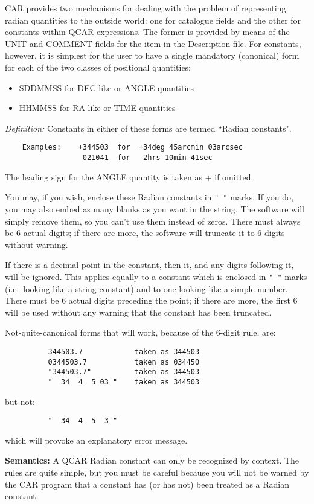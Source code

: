 CAR provides two mechanisms for dealing with the problem of representing radian
quantities to the outside world: one for catalogue fields and the other for
constants within QCAR expressions.
The former is provided by means of the UNIT and COMMENT fields for the item in
the Description file.
For constants,  however, it is simplest for the user to have a single mandatory
(canonical) form for each of the two classes of positional quantities:
\begin{itemize}
\item SDDMMSS  for DEC-like or ANGLE quantities
\item HHMMSS   for RA-like or TIME quantities
\end{itemize}
{\em Definition:} Constants in either of these forms are termed ``Radian
constants".
\begin{verbatim}
    Examples:    +344503  for  +34deg 45arcmin 03arcsec
                  021041  for   2hrs 10min 41sec
\end{verbatim}
The leading sign for the ANGLE quantity is taken as + if omitted.

You may, if you wish, enclose these Radian constants in {\tt "  "} marks.
If you do, you may also embed as many blanks as you want in the string.
The software will simply remove them, so you can't use them instead of zeros.
There must always be 6 actual digits; if there are more, the software will
truncate it to 6 digits without warning.

If there is a decimal point in the constant, then it, and any digits following
it, will be ignored.
This applies equally to a constant which is enclosed in {\tt " "} marks 
(i.e.\ looking like a string constant) and to one looking like a simple number.
There must be 6 actual digits preceding the point; if there are more, the first
6 will be used without any warning that the constant has been truncated.

Not-quite-canonical forms that will work, because of the 6-digit rule, are:
\begin{verbatim}
          344503.7            taken as 344503
          0344503.7           taken as 034450
          "344503.7"          taken as 344503
          "  34  4  5 03 "    taken as 344503
\end{verbatim}
but not:
\begin{verbatim}
          "  34  4  5  3 "
\end{verbatim}
which will provoke an explanatory error message.

{\bf Semantics:} A QCAR Radian constant can only be recognized by context.  
The rules are quite simple, but you must be careful because you will not be
warned by the CAR program that a constant has (or has not) been treated as a
Radian constant.


